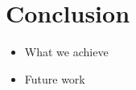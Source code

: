 \chapter{Conclusion}\label{ch4:Conclusion}


\begin{itemize}
    \item What we achieve
    \item Future work
\end{itemize}
 
\newpage
